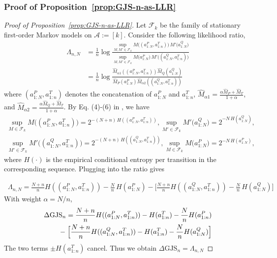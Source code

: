 \documentclass{article}
\theoremstyle{plain}
\theoremstyle{definition}
\theoremstyle{remark}
\begin{document}
\subsubsection{Proof of Proposition~\ref{prop:GJS-n-as-LLR}} \label{sec:proof-llr}
\begin{proof}[Proof of Proposition~\ref{prop:GJS-n-as-LLR}]
Let $\mathcal{F}_k$ be the family of stationary first-order Markov models on $\mathcal{A}:=[k]$. 
Consider the following likelihood ratio,
     \begin{align}
      \Lambda_{n,N} &=   \frac{1}{n}\log\!
\frac{\displaystyle \sup_{M,M'\in\mathcal{F}_k}
M\!\bigl((a^P_{1:N},a^T_{1:n})\bigr)\,M'\!\bigl(a^Q_{1:N}\bigr)}
{\displaystyle \sup_{M,M'\in\mathcal{F}_k}
M\!\bigl(a^P_{1:N}\bigr)\,M'\!\bigl((a^Q_{1:N},a^T_{1:n})\bigr)} \\
&=\frac{1}{n}\log \frac{\hat{M}_{\alpha 1}((a^P_{1:N},a^T_{1:n}))\hat{M}_Q(a^Q_{1:N})}{\hat{M}_P(a^P_{1:N})\hat{M}_{\alpha 2}((a^Q_{1:N},a^T_{1:n}))}
     \end{align}
where $(a^P_{1:N},a^T_{1:n})$ denotes the concatenation of $a^P_{1:N}$ and $a^T_{1:n}$, $\hat{M}_{\alpha 1}=\frac{\alpha \hat{M}_P+ \hat{M}_T}{1+\alpha}$, and $\hat{M}_{\alpha 2}=\frac{\alpha \hat{M}_Q+ \hat{M}_T}{1+\alpha}$. By Eq. (4)-(6) in \citet{32134}, we have
\begin{align}
\sup_{M \in\mathcal{F}_k}M\bigl((a^P_{1:N},a^T_{1:n})\bigr)
   = 2^{-(N+n)\,H((a^P_{1:N},a^T_{1:n}))}, 
\sup_{M'\in\mathcal{F}_k}M'\bigl(a^Q_{1:N}\bigr)
   = 2^{-N\,H(a^Q_{1:N})}, \\
   \sup_{M'\in\mathcal{F}_k}M'\bigl((a^Q_{1:N},a^T_{1:n})\bigr)
   = 2^{-(N+n)\,H((a^Q_{1:N},a^T_{1:n}))}, 
\sup_{M\in\mathcal{F}_k}M\bigl(a^P_{1:N}\bigr)
   = 2^{-N\,H(a^P_{1:N})},
\end{align}
where $H(\cdot)$ is the empirical conditional entropy per transition in the corresponding sequence. Plugging into the ratio gives

\begin{align}
    \,
\Lambda_{n,N}
  = \frac{N+n}{n}H((a^P_{1:N},a^T_{1:n}))-\frac{N}{n}\,H(a^P_{1:N})
    -\bigl[\frac{N+n}{n}H((a^Q_{1:N},a^T_{1:n}))-\frac{N}{n}\,H(a^Q_{1:N})\bigr]
\,
\end{align}
With weight \(\alpha=N/n\),
\begin{align}
    \Delta\mathrm{GJS}_n
  = \frac{N+n}{n}H((a^P_{1:N},a^T_{1:n}))-H(a^T_{1:n})-\frac{N}{n}H(a^P_{1:n})
    \nonumber\\\;-\;
    \Bigl[\frac{N+n}{n}H((a^Q_{1:N},a^T_{1:n}))-H(a^T_{1:n})-\frac{N}{n}H(a^Q_{1:N})\Bigr] \label{eq:gjs-entropy}
\end{align}
The two terms \(\pm H(a^T_{1:n})\) cancel. Thus we obtain $\Delta \text{GJS}_n = \Lambda_{n,N}$

    
\end{proof}
\end{document}
